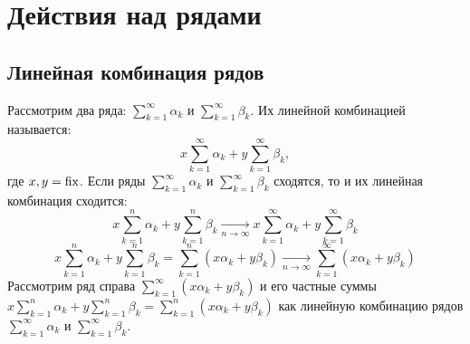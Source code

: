 \documentclass[../../main.tex]{subfiles}
\begin{document}
\section{Действия над рядами}
\subsection{Линейная комбинация рядов}
Рассмотрим два ряда:
$\sum\limits_{k = 1}^{\infty} \alpha_k$ и
$\sum\limits_{k = 1}^{\infty} \beta_k$.
Их линейной комбинацией называется:
\[x \sum\limits_{k = 1}^{\infty} \alpha_k +
y \sum\limits_{k = 1}^{\infty} \beta_k,\]
где $x,y = \operatorname{fix}$.
Если ряды
$\sum\limits_{k = 1}^{\infty} \alpha_k$ и
$\sum\limits_{k = 1}^{\infty} \beta_k$
сходятся, то и их линейная комбинация сходится:
\[x \sum\limits_{k = 1}^{n} \alpha_k + y \sum\limits_{k = 1}^{n} \beta_k
\underset{n \to \infty} {\longrightarrow}
x \sum\limits_{k = 1}^{\infty} \alpha_k +
y \sum\limits_{k = 1}^{\infty} \beta_k\]
\[x \sum\limits_{k = 1}^{n} \alpha_k + y \sum\limits_{k = 1}^{n} \beta_k
= \sum\limits_{k = 1}^{n} (x \alpha_k + y \beta_k)
\underset{n \to \infty} {\longrightarrow}
\sum\limits_{k = 1}^{\infty} (x \alpha_k + y \beta_k)\]
Рассмотрим ряд справа $\sum\limits_{k = 1}^{\infty} (x \alpha_k + y \beta_k)$
и его частные суммы
$x \sum\limits_{k = 1}^{n} \alpha_k + y \sum\limits_{k = 1}^{n} \beta_k
= \sum\limits_{k = 1}^{n} (x \alpha_k + y \beta_k)$
как линейную комбинацию рядов $\sum\limits_{k = 1}^{\infty} \alpha_k$ и
$\sum\limits_{k = 1}^{\infty} \beta_k$.
\end{document}
